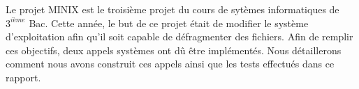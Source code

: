 Le projet MINIX est le troisième projet du cours de sytèmes informatiques de $3^{ième}$ Bac. Cette année, le but de ce projet était de modifier le système d'exploitation afin qu'il soit capable de défragmenter des fichiers. Afin de remplir ces objectifs, deux appels systèmes ont dû être implémentés. Nous détaillerons comment nous avons construit ces appels ainsi que les tests effectués dans ce rapport.
